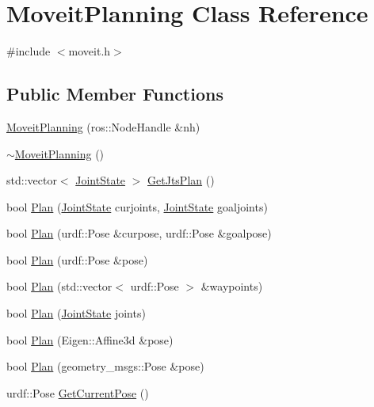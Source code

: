 \hypertarget{classMoveitPlanning}{\section{Moveit\-Planning Class Reference}
\label{classMoveitPlanning}
}


{\ttfamily \#include $<$moveit.\-h$>$}

\subsection*{Public Member Functions}
\begin{DoxyCompactItemize}
\item 
\hyperlink{classMoveitPlanning_a4138e1aed9641e0df587ec2b7e0663fe}{Moveit\-Planning} (ros\-::\-Node\-Handle \&nh)
\item 
\hyperlink{classMoveitPlanning_a0665e6d78bc4ee6c58c58ba1b43f6b7a}{$\sim$\-Moveit\-Planning} ()
\item 
std\-::vector$<$ \hyperlink{RCS_8h_aa4adb93a26caa4dacba9c9614e283245}{Joint\-State} $>$ \hyperlink{classMoveitPlanning_adcd57dfed95d3628cffbe5b88f0896cf}{Get\-Jts\-Plan} ()
\item 
bool \hyperlink{classMoveitPlanning_a37dd79bdbcb114884100bd68b5f107b7}{Plan} (\hyperlink{RCS_8h_aa4adb93a26caa4dacba9c9614e283245}{Joint\-State} curjoints, \hyperlink{RCS_8h_aa4adb93a26caa4dacba9c9614e283245}{Joint\-State} goaljoints)
\item 
bool \hyperlink{classMoveitPlanning_ab83293f9a377f8539c949ffdd5c89e0a}{Plan} (urdf\-::\-Pose \&curpose, urdf\-::\-Pose \&goalpose)
\item 
bool \hyperlink{classMoveitPlanning_a0d645edc1964fd98600798f4c7474a16}{Plan} (urdf\-::\-Pose \&pose)
\item 
bool \hyperlink{classMoveitPlanning_a10f7770fcaa229cdffd2f63215bed37b}{Plan} (std\-::vector$<$ urdf\-::\-Pose $>$ \&waypoints)
\item 
bool \hyperlink{classMoveitPlanning_a21c7727e0906a6ed2e24a31165ed3ba6}{Plan} (\hyperlink{RCS_8h_aa4adb93a26caa4dacba9c9614e283245}{Joint\-State} joints)
\item 
bool \hyperlink{classMoveitPlanning_a535856f4f406cb7d2f89c0bd03618109}{Plan} (Eigen\-::\-Affine3d \&pose)
\item 
bool \hyperlink{classMoveitPlanning_ac0e53ee15cf0ac2f605422534963d78e}{Plan} (geometry\-\_\-msgs\-::\-Pose \&pose)
\item 
urdf\-::\-Pose \hyperlink{classMoveitPlanning_ab5304af5d89d46daafa10a5b7698a006}{Get\-Current\-Pose} ()

\end{DoxyCompactItemize}
